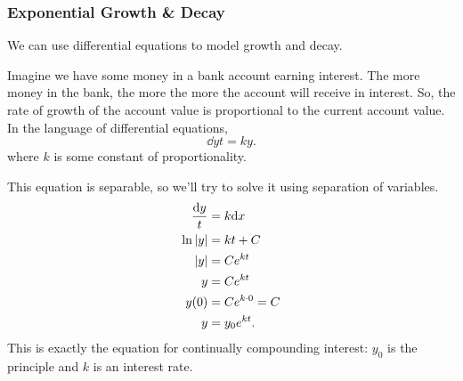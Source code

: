 \subsubsection{Exponential Growth \& Decay}
We can use differential equations to model growth and decay.

\begin{example}
	Imagine we have some money in a bank account earning interest.
	The more money in the bank, the more the more the account will receive in interest.
	So, the rate of growth of the account value is proportional to the current account value.
	In the language of differential equations,
	\begin{equation*}
		\dd{y}{t} = ky.
	\end{equation*}
	where $k$ is some constant of proportionality.
\end{example}
This equation is separable, so we'll try to solve it using separation of variables.
\begin{align*}
	\frac{\mathrm{d} y}{t} &= k\mathrm{d} x \\
	\ln{\lvert y \rvert} &= kt + C \\
	\lvert y \rvert &= Ce^{kt} \\
	y &= Ce^{kt} \\
	y(0) &= Ce^{k\cdot 0} = C \\
	y &= y_0e^{kt}.
\end{align*}
\noindent
This is exactly the equation for continually compounding interest: $y_0$ is the principle and $k$ is an interest rate.

